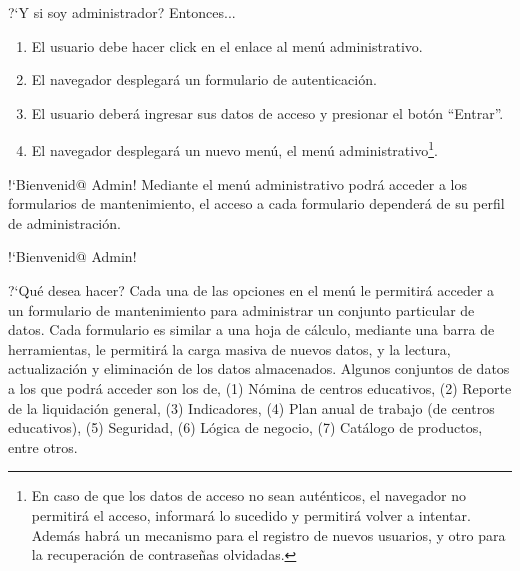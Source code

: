 \documentclass[xcolor=table, aspectratio=169]{beamer}
\begin{document}
\begin{frame}[t]{?`Y si soy administrador?}
    Entonces...
    
	\begin{enumerate}
		\item El usuario debe hacer click en el enlace al men\'u administrativo.
		\item El navegador desplegar\'a un formulario de autenticaci\'on.
		\item El usuario deber\'a ingresar sus datos de acceso y presionar el bot\'on ``Entrar''.
		\item El navegador desplegar\'a un nuevo men\'u, el men\'u administrativo\footnote{En caso de que los datos de acceso no sean aut\'enticos, el navegador no permitir\'a el acceso, informar\'a lo sucedido y permitir\'a volver a intentar. Adem\'as habr\'a un mecanismo para el registro de nuevos usuarios, y otro para la recuperaci\'on de contrase\~nas olvidadas.}.
	\end{enumerate}
		
	\begin{block}{!`Bienvenid@ Admin!}
		Mediante el men\'u administrativo podr\'a acceder a los formularios de mantenimiento, el acceso a cada formulario depender\'a de su perfil de administraci\'on.
	\end{block}
\end{frame}

\begin{frame}[t]{!`Bienvenid@ Admin!}
	\begin{block}{?`Qu\'e desea hacer?}
		Cada una de las opciones en el men\'u le permitir\'a acceder a un formulario de mantenimiento para administrar un conjunto particular de datos. Cada formulario es similar a una hoja de c\'alculo, mediante una barra de herramientas, le permitir\'a la carga masiva de nuevos datos, y la lectura, actualizaci\'on y eliminaci\'on de los datos almacenados. Algunos conjuntos de datos a los que podr\'a acceder son los de, (1) N\'omina de centros educativos, (2) Reporte de la liquidaci\'on general, (3) Indicadores, (4) Plan anual de trabajo (de centros educativos), (5) Seguridad, (6) L\'ogica de negocio, (7) Cat\'alogo de productos, entre otros.
	\end{block}
\end{frame}
\end{document}
